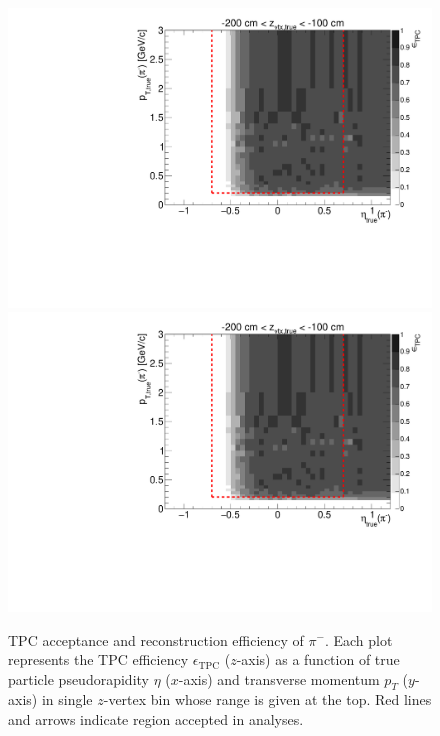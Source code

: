 \begin{figure}[hb]
\caption[TPC acceptance and reconstruction efficiency of $\pi^{-}$.]{TPC acceptance and reconstruction efficiency of $\pi^{-}$. Each plot represents the TPC efficiency $\epsilon_{\text{TPC}}$ ($z$-axis) as a function of true particle pseudorapidity $\eta$ ($x$-axis) and transverse momentum $p_{T}$ ($y$-axis) in single $z$-vertex bin whose range is given at the top. Red lines and arrows indicate region accepted in analyses.}\label{fig:eff_pion_minus}
\centering
\parbox{0.495\textwidth}{
  \centering
  \includegraphics[width=\linewidth,page=3]{graphics/eff/Eff2D_TPC_pion_Minus.pdf}\\
  \includegraphics[width=\linewidth,page=5]{graphics/eff/Eff2D_TPC_pion_Minus.pdf}\\
}
\end{figure}
